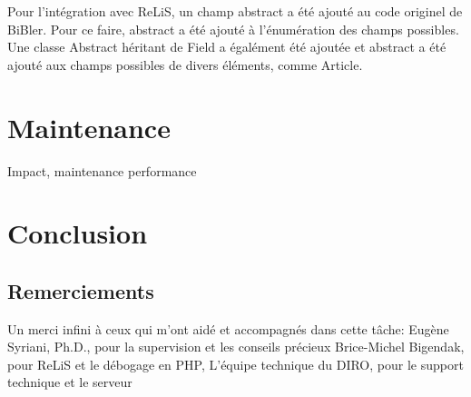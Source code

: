 \documentclass[12pt,titlepage]{article}
\let\oldsection\section
\renewcommand\section{\clearpage\oldsection}
\begin{document}
Pour l'intégration avec ReLiS, un champ abstract a été ajouté au code originel de BiBler. Pour ce faire, abstract a été ajouté à l'énumération des champs possibles. Une classe Abstract héritant de Field a égalément été ajoutée et abstract a été ajouté aux champs possibles de divers éléments, comme Article.


\section{Maintenance}

Impact, maintenance
performance



\section{Conclusion}
\subsection{Remerciements}
Un merci infini à ceux qui m'ont aidé et accompagnés dans cette tâche: \newline
Eugène Syriani, Ph.D., pour la supervision et les conseils précieux\newline
Brice-Michel Bigendak, pour ReLiS et le débogage en PHP,
L'équipe technique du DIRO, pour le support technique et le serveur
{}

\end{document}
